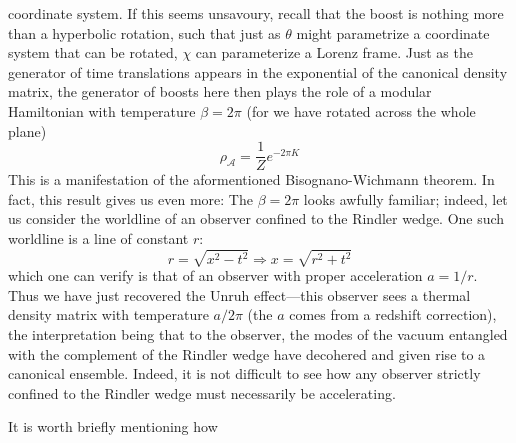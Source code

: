 \documentclass{report}
\begin{document}
coordinate system. If this seems unsavoury, recall that the boost is nothing 
more than a hyperbolic rotation, such that just as $ \theta $ might parametrize 
a coordinate system that can be rotated, $ \chi $ can parameterize a Lorenz frame. 
Just as the generator of time translations appears in the exponential of the 
canonical density matrix, the generator of boosts here then plays the role of a 
modular Hamiltonian with temperature $ \beta = 2\pi $ (for we have rotated across 
the whole plane)
\begin{equation*}
	\rho_\mathcal{A} = \frac{1}{Z} e^{-2\pi K}
\end{equation*}
This is a manifestation of the aformentioned Bisognano-Wichmann theorem. In fact, 
this result gives us even more: The $ \beta=2\pi $ looks awfully familiar; indeed, let us 
consider the worldline of an observer confined to the Rindler wedge. One such 
worldline is a line of constant $ r $: 
\begin{equation*}
	r = \sqrt{x^2 - t^2} \Longrightarrow x = \sqrt{r^2 + t^2}
\end{equation*}
which one can verify is that of an observer with proper acceleration 
$ a=1/r $. Thus we have just recovered the Unruh effect---this observer sees 
a thermal density matrix with temperature $ a/2\pi $ (the $ a $ comes from a 
redshift correction), the interpretation being that to the observer, the 
modes of the vacuum entangled with the complement of the Rindler wedge have
decohered and given rise to a canonical ensemble. Indeed, it is not difficult 
to see how any observer strictly confined to the Rindler wedge must necessarily 
be accelerating.

It is worth briefly mentioning how 
\end{document}
